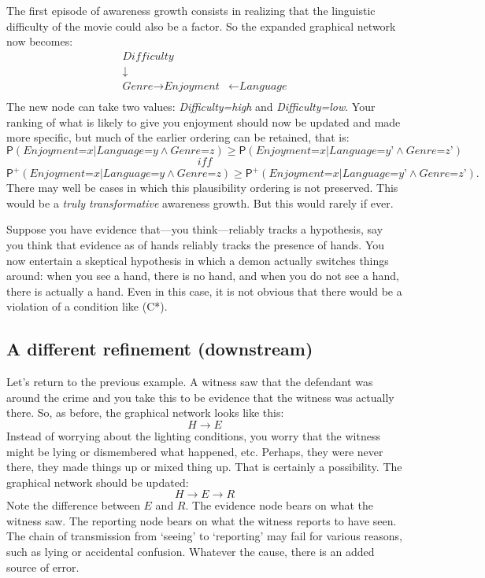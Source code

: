 \documentclass[
  11pt,
  dvipsnames,enabledeprecatedfontcommands]{scrartcl}
\newcommand{\pr}[1]{\ensuremath{\mathsf{P}(#1)}}
\newcommand{\ppr}[2]{\ensuremath{\mathsf{P}^{#1}(#2)}}
\begin{document}
The first episode of awareness growth consists in realizing that the
linguistic difficulty of the movie could also be a factor. So the
expanded graphical network now becomes: \begin{align*}
\textit{Difficulty} &\\
\downarrow \\
\textit{Genre} \rightarrow \textit{Enjoyment} &\leftarrow \textit{Language}\\
\end{align*} \noindent The new node can take two values:
\textit{Difficulty=high} and \textit{Difficulty=low}. Your ranking of
what is likely to give you enjoyment should now be updated and made more
specific, but much of the earlier ordering can be retained, that is:
\[\pr{\textit{Enjoyment=x} \vert \textit{Language=y} \wedge \textit{Genre=z}} \geq \pr{\textit{Enjoyment=x} \vert \textit{Language=y'} \wedge \textit{Genre=z'}}\]
\[\textit{ iff }\]
\[\ppr{+}{\textit{Enjoyment=x} \vert \textit{Language=y} \wedge \textit{Genre=z}} \geq \ppr{+}{\textit{Enjoyment=x} \vert \textit{Language=y'} \wedge \textit{Genre=z'}}.\]
There may well be cases in which this plausibility ordering is not
preserved. This would be a \textit{truly transformative} awareness
growth. But this would rarely if ever.

Suppose you have evidence that---you think---reliably tracks a
hypothesis, say you think that evidence as of hands reliably tracks the
presence of hands. You now entertain a skeptical hypothesis in which a
demon actually switches things around: when you see a hand, there is no
hand, and when you do not see a hand, there is actually a hand. Even in
this case, it is not obvious that there would be a violation of a
condition like (C*).

\hypertarget{a-different-refinement-downstream}{%
\subsection{A different refinement
(downstream)}\label{a-different-refinement-downstream}}

Let's return to the previous example. A witness saw that the defendant
was around the crime and you take this to be evidence that the witness
was actually there. So, as before, the graphical network looks like
this: \[H\rightarrow E\] Instead of worrying about the lighting
conditions, you worry that the witness might be lying or dismembered
what happened, etc. Perhaps, they were never there, they made things up
or mixed thing up. That is certainly a possibility. The graphical
network should be updated: \[H\rightarrow E \rightarrow R\] Note the
difference between \(E\) and \(R\). The evidence node bears on what the
witness saw. The reporting node bears on what the witness reports to
have seen. The chain of transmission from `seeing' to `reporting' may
fail for various reasons, such as lying or accidental confusion.
Whatever the cause, there is an added source of error.
\end{document}
